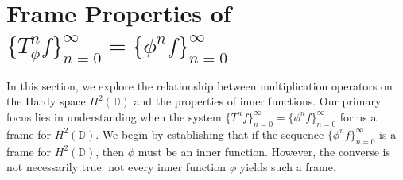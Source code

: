 \documentclass[12pt,titlepage]{amsart}
\theoremstyle{definition}
\theoremstyle{remark}
\begin{document}
\section{\textbf{Frame Properties of $\{T_{\phi}^nf\}_{n=0}^\infty=\{\phi^n f\}_{n=0}^\infty$ }}
In this section, we explore the relationship between
multiplication operators on the Hardy space $H^2(\mathbb{D})$ and
the properties of inner functions. Our primary focus lies in
understanding when the system $\{T^n f\}_{n=0}^\infty = \{\phi^n
f\}_{n=0}^\infty$ forms a frame for $H^2(\mathbb{D})$. We begin by
establishing that if the sequence $\{\phi^n f\}_{n=0}^\infty$ is a
frame for $H^2(\mathbb{D})$, then $\phi$ must be an inner
function. However, the converse is not necessarily true: not every
inner function $\phi$ yields such a frame.
\end{document}
